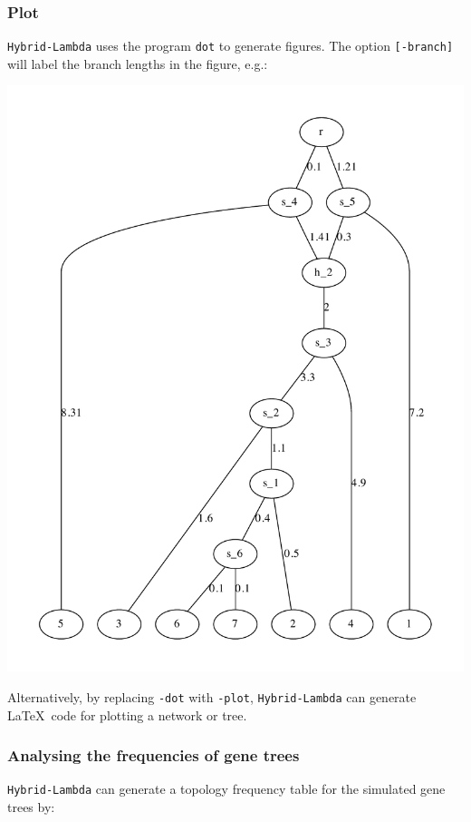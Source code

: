 \subsubsection{Plot}
{\tt Hybrid-Lambda} uses the program {\tt dot} to generate figures. The option {\tt [-branch]} will label the branch lengths in the figure, e.g.:
\begin{center}
\includegraphics[width=.8\textwidth]{branch.pdf}
\end{center}

Alternatively, by replacing {\tt -dot} with {\tt -plot}, {\tt Hybrid-Lambda} can generate \LaTeX\ code for plotting a network or tree.

\subsubsection{Analysing the frequencies of gene trees}
{\tt Hybrid-Lambda} can generate a topology frequency table for the simulated gene trees by:

